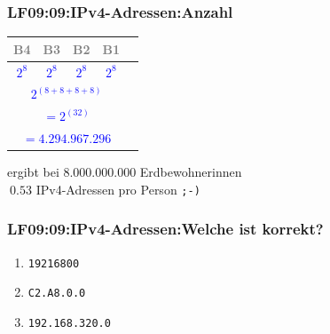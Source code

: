 \begin{frame}[fragile]  
  \frametitle{LF09:09:IPv4-Adressen:Anzahl}
  \vspace{0.2cm}
  \begin{footnotesize}
  \begin{center}
    \renewcommand{\arraystretch}{1.5}
    \begin{tabular}{|c|c|c|c|c|}
    \hline
    \textcolor{gray}{\tiny{B4}} & \textcolor{gray}{\tiny{B3}} & \textcolor{gray}{\tiny{B2}} 
    & \textcolor{gray}{\tiny{B1}}  \\
	  \hline
    \hline
	  \textcolor{blue}{\texttt{$2^8$}} & \textcolor{blue}{\texttt{$2^8$}} & \textcolor{blue}{\texttt{$2^8$}} & \textcolor{blue}{\texttt{$2^8$}} \\
    \hline
    \multicolumn{4}{|c|}{\textcolor{blue}{\texttt{$2^{(8 + 8 + 8 + 8)}$}}} \\
    \hline
    \multicolumn{4}{|c|}{\textcolor{blue}{\texttt{$= 2^{(32)}$}}} \\
    \hline
    \multicolumn{4}{|c|}{\textcolor{blue}{\texttt{$= 4.294.967.296$}}} \\
    \hline
  \end{tabular}
\end{center}
\end{footnotesize}

\vspace{0.4cm}
\begin{flushright}
\begin{tiny}
ergibt bei $8.000.000.000$ Erdbewohnerinnen\\ $~0.53$ IPv4-Adressen pro Person \texttt{;-)}
\end{tiny}
\end{flushright}

\end{frame}

\begin{frame}[fragile]  
  \frametitle{LF09:09:IPv4-Adressen:Welche ist korrekt?}
  \vspace{1cm}
  \begin{center}
  \begin{minipage}{0.5\textwidth}
  \begin{enumerate}
    \item \texttt{19216800}
    \item \texttt{C2.A8.0.0}
    \item \texttt{192.168.320.0}
  \end{enumerate}
  \end{minipage}
  \end{center}
\end{frame}


